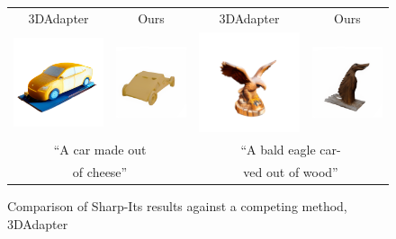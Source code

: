 \begin{figure}[h]
\setlength{\tabcolsep}{1pt}
\begin{tabular}{cccc}
    3DAdapter & Ours & 3DAdapter & Ours \\
    \includegraphics[width=0.25\linewidth]{images/rebuttal/3dadapter_comparison/car_cheese_3dadapter.png} &
    \includegraphics[width=0.25\linewidth]{images/rebuttal/3dadapter_comparison/cheese_car_000.png} &
    \includegraphics[width=0.25\linewidth]{images/rebuttal/3dadapter_comparison/eagle_3dadapter.png} &
    \includegraphics[width=0.25\linewidth]{images/rebuttal/3dadapter_comparison/wood_bald_eagle_000.png} \\
    \multicolumn{2}{c}{``A car made out} & \multicolumn{2}{c}{``A bald eagle car-} \\
    \multicolumn{2}{c}{of cheese''} & \multicolumn{2}{c}{ved out of wood''} 
\end{tabular}
\caption{Comparison of Sharp-Its results against a competing method, 3DAdapter}
\end{figure}